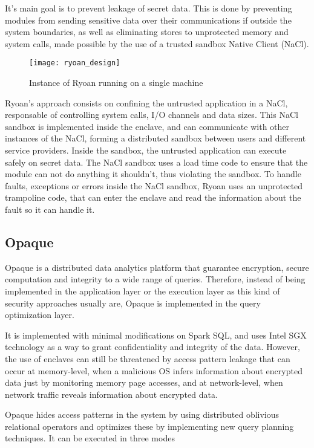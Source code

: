 It's main goal is to prevent leakage of secret data. This is done by preventing modules from sending sensitive data over their communications if outside the system boundaries, as well as eliminating stores to unprotected memory and system calls, made possible by the use of a trusted sandbox Native Client (NaCl). 

\begin{figure}[htbp]
	\centering
	{\texttt{[image: ryoan\_design]}}%
	\caption{Instance of Ryoan running on a single machine}
\end{figure}

Ryoan's approach consists on confining the untrusted application in a NaCl, responsable of controlling system calls, I/O channels and data sizes. This NaCl sandbox is implemented inside the enclave, and can communicate with other instances of the NaCl, forming a distributed sandbox between users and different service providers. Inside the sandbox, the untrusted application can execute safely on secret data. The NaCl sandbox uses a load time code to ensure that the module can not do anything it shouldn't, thus violating the sandbox. To handle faults, exceptions or errors inside the NaCl sandbox, Ryoan uses an unprotected trampoline code, that can enter the enclave and read the information about the fault so it can handle it.
\subsection{Opaque}
\label{ssec:opaque}

Opaque \cite{opaquePaper} is a distributed data analytics platform that guarantee encryption, secure computation and integrity to a wide range of queries. Therefore, instead of being implemented in the application layer or the execution layer as this kind of security approaches usually are, Opaque is implemented in the query optimization layer. 

It is implemented with minimal modifications on Spark SQL, and uses Intel SGX technology as a way to grant confidentiality and integrity of the data. 
However, the use of enclaves can still be threatened by access pattern leakage that can occur at memory-level, when a malicious OS infers information about encrypted data just by monitoring memory page accesses, and at network-level, when network traffic reveals information about encrypted data.

Opaque hides access patterns in the system by using distributed oblivious relational operators and optimizes these by implementing new query planning techniques. It can be executed in three modes

